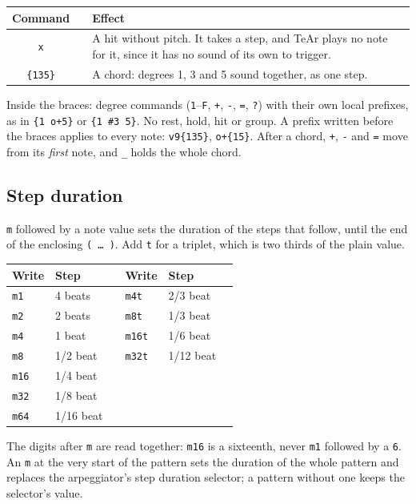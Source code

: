\documentclass[11pt,a4paper]{article}
\newcommand{\pat}[1]{\texttt{#1}}
\begin{document}
\begin{center}
\begin{tabular}{@{}clp{85mm}@{}}
\toprule
\textbf{Command} & & \textbf{Effect}\\
\midrule
\pat{x}      & & A hit without pitch. It takes a step, and TeAr plays no note
                 for it, since it has no sound of its own to trigger.\\
\pat{\{135\}} & & A chord: degrees 1, 3 and 5 sound together, as one step.\\
\bottomrule
\end{tabular}
\end{center}

Inside the braces: degree commands (\pat{1}--\pat{F}, \pat{+}, \pat{-},
\pat{=}, \pat{?}) with their own local prefixes, as in \pat{\{1 o+5\}} or
\pat{\{1 \#3 5\}}. No rest, hold, hit or group. A prefix written before the
braces applies to every note: \pat{v9\{135\}}, \pat{o+\{15\}}. After a chord,
\pat{+}, \pat{-} and \pat{=} move from its \emph{first} note, and \pat{\_} holds
the whole chord.

\subsection{Step duration}

\pat{m} followed by a note value sets the duration of the steps that follow,
until the end of the enclosing \pat{( \ldots\ )}. Add \pat{t} for a triplet,
which is two thirds of the plain value.

\begin{center}
\begin{tabular}{@{}lll@{\qquad}lll@{}}
\toprule
\textbf{Write} & \textbf{Step} & & \textbf{Write} & \textbf{Step}\\
\midrule
\pat{m1}  & 4 beats   & & \pat{m4t}  & 2/3 beat\\
\pat{m2}  & 2 beats   & & \pat{m8t}  & 1/3 beat\\
\pat{m4}  & 1 beat    & & \pat{m16t} & 1/6 beat\\
\pat{m8}  & 1/2 beat  & & \pat{m32t} & 1/12 beat\\
\pat{m16} & 1/4 beat  & & & \\
\pat{m32} & 1/8 beat  & & & \\
\pat{m64} & 1/16 beat & & & \\
\bottomrule
\end{tabular}
\end{center}

The digits after \pat{m} are read together: \pat{m16} is a sixteenth, never
\pat{m1} followed by a \pat{6}. An \pat{m} at the very start of the pattern sets
the duration of the whole pattern and replaces the arpeggiator's step duration
selector; a pattern without one keeps the selector's value.
\end{document}
